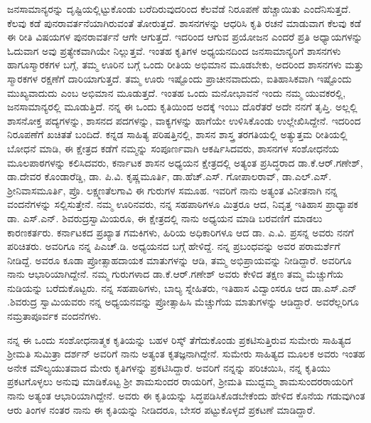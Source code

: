 ಜನಸಾಮಾನ್ಯರನ್ನು ದೃಷ್ಟಿಯಲ್ಲಿಟ್ಟುಕೊಂಡು ಬರೆದಿರುವುದರಿಂದ ಕೆಲವೆಡೆ ನಿರೂಪಣೆ ಹೆಚ್ಚಾಯಿತು ಎಂದೆನಿಸು\-ತ್ತದೆ. ಕೆಲವು ಕಡೆ ಪುನರಾವರ್ತನೆಯಾಗಿರುವಂತೆ ತೋರುತ್ತದೆ. ಶಾಸನಗಳನ್ನು ಆಧರಿಸಿ ಕೃತಿ ರಚನೆ ಮಾಡುವಾಗ ಕೆಲವು ಕಡೆ ಈ ರೀತಿ ವಿಷಯಗಳ ಪುನರಾವರ್ತನೆ ಆಗೇ ಆಗುತ್ತದೆ. ಇದರಿಂದ ಆಗುವ ಪ್ರಯೋಜನ ಎಂದರೆ ಪ್ರತಿ ಅಧ್ಯಾಯಗಳನ್ನು ಓದುವಾಗ ಅವು ಪ್ರತ್ಯೇಕವಾಗಿಯೇ ನಿಲ್ಲುತ್ತವೆ. ಇಂತಹ ಕೃತಿಗಳ ಅಧ್ಯಯನದಿಂದ ಜನಸಾಮಾನ್ಯರಿಗೆ ಶಾಸನಗಳು ಹಾಗೂ\break ಸ್ಮಾರಕಗಳ ಬಗ್ಗೆ, ತಮ್ಮ ಊರಿನ ಬಗ್ಗೆ ಒಂದು ರೀತಿಯ ಅಭಿಮಾನ ಮೂಡಬೇಕು, ಅದರಿಂದ ಶಾಸನಗಳು ಮತ್ತು ಸ್ಮಾರಕಗಳ ರಕ್ಷಣೆಗೆ ದಾರಿಯಾಗುತ್ತದೆ. ತಮ್ಮ ಊರು ಇಷ್ಟೊಂದು ಪ್ರಾಚೀನವಾದುದು, ಐತಿಹಾಸಿಕವಾಗಿ ಇಷ್ಟೊಂದು ಮುಖ್ಯವಾದುದು ಎಂಬ ಅಭಿಮಾನ ಮೂಡುತ್ತದೆ. ಇಂತಹ ಒಂದು ಮನೋಭಾವನೆ ಇಂದು ನಮ್ಮ ಯುವಕರಲ್ಲಿ, ಜನಸಾಮಾನ್ಯರಲ್ಲಿ ಮೂಡು\-ತ್ತಿದೆ. ನನ್ನ ಈ ಒಂದು ಕೃತಿಯಿಂದ ಅದಕ್ಕೆ ಇಂಬು ದೊರೆತರೆ ಅದೇ ನನಗೆ ತೃಪ್ತಿ. ಅಲ್ಲಲ್ಲಿ ಶಾಸನೋಕ್ತ ಪದ್ಯಗಳನ್ನು, ಶಾಸನದ ಪದಗಳನ್ನು, ವಾಕ್ಯಗಳನ್ನು ಹಾಗೆಯೇ ಉಳಿಸಿಕೊಂಡು ಉಲ್ಲೇಖಿಸಿದ್ದೇನೆ. ಇದರಿಂದ ನಿರೂಪಣೆಗೆ ಖಚಿತತೆ ಬಂದಿದೆ. ಕನ್ನಡ ಸಾಹಿತ್ಯ ಪರಿಷತ್ತಿನಲ್ಲಿ, ಶಾಸನ ಶಾಸ್ತ್ರ ತರಗತಿಯಲ್ಲಿ ಅತ್ಯುತ್ತಮ ರೀತಿಯಲ್ಲಿ ಬೋಧನೆ ಮಾಡಿ, ಈ ಕ್ಷೇತ್ರದ ಕಡೆಗೆ ನಮ್ಮನ್ನು ಸಂಪೂರ್ಣವಾಗಿ ಆಕರ್ಷಿಸಿದವರು, ಶಾಸನಗಳ ಸಂಶೋಧನೆಯ ಮೂಲಪಾಠಗಳನ್ನು ಕಲಿಸಿದವರು, ಕರ್ನಾಟಕ ಶಾಸನ ಅಧ್ಯಯನ ಕ್ಷೇತ್ರದಲ್ಲಿ ಅತ್ಯಂತ ಪ್ರಸಿದ್ಧರಾದ ಡಾ.ಕೆ.ಆರ್​.ಗಣೇಶ್​, ಡಾ.ದೇವರ ಕೊಂಡಾರೆಡ್ಡಿ, ಡಾ. ಪಿ.ವಿ. ಕೃಷ್ಣಮೂರ್ತಿ, ಡಾ.ಹೆಚ್​.ಎಸ್​. ಗೋಪಾಲರಾವ್​, ಡಾ.ಎಲ್​.ಎಸ್​. ಶ‍್ರೀನಿವಾಸಮೂರ್ತಿ, ಪ್ರೊ. ಲಕ್ಷ್ಮಣತೆಲಗಾವಿ ಈ ಗುರುಗಳ ಸಮೂಹ. ಇವರಿಗೆ ನಾನು ಅತ್ಯಂತ ವಿನೀತನಾಗಿ ನನ್ನ ವಂದನೆಗಳನ್ನು ಸಲ್ಲಿಸುತ್ತೇನೆ. ನಮ್ಮ ಊರಿನವರು, ನನ್ನ ಸಹಪಾಠಿಗಳೂ ಮಿತ್ರರೂ ಆದ, ನಿವೃತ್ತ ಇತಿಹಾಸ ಪ್ರಾಧ್ಯಾಪಕ ಡಾ. ಎಸ್​.ಎನ್​. ಶಿವರುದ್ರಸ್ವಾಮಿಯರೂ, ಈ ಕ್ಷೇತ್ರದಲ್ಲಿ ನಾನು ಅಧ್ಯಯನ ಮಾಡಿ ಬರವಣಿಗೆ ಮಾಡಲು ಕಾರಣಕರ್ತರು. ಕರ್ನಾಟಕದ ಪ್ರಖ್ಯಾತ ಗಮಕಿಗಳು, ಹಿರಿಯ ಅಧಿಕಾರಿಗಳೂ ಆದ ಡಾ. ಎ.ವಿ. ಪ್ರಸನ್ನ ಅವರು ನನಗೆ ಪರಿಚಿತರು. ಅವರಿಗೂ ನನ್ನ ಪಿಎಚ್​.ಡಿ. ಅಧ್ಯಯನದ ಬಗ್ಗೆ ಹೇಳಿದ್ದೆ. ನನ್ನ ಪ್ರಬಂಧವನ್ನು ಅವರ ಪರಾಮರ್ಶೆಗೆ ನೀಡಿದ್ದೆ. ಅವರೂ ಕೂಡಾ ಪ್ರೋತ್ಸಾಹದಾಯಕ ಮಾತುಗಳನ್ನು ಆಡಿ, ತಮ್ಮ ಅಭಿಪ್ರಾಯವನ್ನು ನೀಡಿದ್ದಾರೆ. ಅವರಿಗೂ ನಾನು ಆಭಾರಿಯಾಗಿದ್ದೇನೆ. ನಮ್ಮ ಗುರುಗಳಾದ ಡಾ.ಕೆ.ಆರ್​.ಗಣೇಶ್​ ಅವರು ಕೇಳಿದ ತಕ್ಷಣ ತಮ್ಮ ಮೆಚ್ಚುಗೆಯ ನುಡಿಯನ್ನು ಬರೆದು\-ಕೊಟ್ಟರು. ನನ್ನ ಸಹಪಾಠಿಗಳು, ಬಾಲ್ಯ ಸ್ನೇಹಿತರು, ಇತಿಹಾಸ ವಿದ್ವಾಂಸರೂ ಆದ ಡಾ.ಎಸ್​.ಎನ್​.ಶಿವರುದ್ರ ಸ್ವಾಮಿಯವರು ನನ್ನ ಅಧ್ಯಯನವನ್ನು ಪ್ರೋತ್ಸಾಹಿಸಿ ಮೆಚ್ಚುಗೆಯ ಮಾತುಗಳನ್ನು ಆಡಿದ್ದಾರೆ. ಅವರೆಲ್ಲರಿಗೂ ನಮ್ರತಾಪೂರ್ವಕ ವಂದನೆಗಳು.

ನನ್ನ ಈ ಒಂದು ಸಂಶೋಧನಾತ್ಮಕ ಕೃತಿಯನ್ನು ಬಹಳ ರಿಸ್ಕ್​ ತೆಗೆದುಕೊಂಡು ಪ್ರಕಟಿಸುತ್ತಿರುವ ಸುಮೇರು ಸಾಹಿತ್ಯದ ಶ‍್ರೀಮತಿ ಸುಮಿತ್ರಾ ದರ್ಶನ್​ ಅವರಿಗೆ ನಾನು ಅತ್ಯಂತ ಕೃತಜ್ಞನಾಗಿದ್ದೇನೆ. ಸುಮೇರು ಸಾಹಿತ್ಯದ ಮೂಲಕ ಅವರು ಇಂತಹ ಅನೇಕ ಮೌಲ್ಯಯುತವಾದ ಮೇರು ಕೃತಿಗಳನ್ನು ಪ್ರಕಟಿಸಿದ್ದಾರೆ. ಅವರಿಗೆ ನನ್ನನ್ನು ಪರಿಚಯಿಸಿ, ನನ್ನ ಕೃತಿಯು ಪ್ರಕಟಗೊಳ್ಳಲು ಅನುವು ಮಾಡಿಕೊಟ್ಟ ಶ‍್ರೀ ಶಾಮಸುಂದರ ರಾಯರಿಗೆ, ಶ‍್ರೀಮತಿ ಮುದ್ದಮ್ಮ ಶಾಮಸುಂದರರಾಯರಿಗೆ ನಾನು ಅತ್ಯಂತ ಆಭಾರಿಯಾಗಿದ್ದೇನೆ. ಅವರು ಈ ಕೃತಿಯನ್ನು ಸಿದ್ಧಪಡಿಸಿಕೊಡಬೇಕೆಂದು ಹೇಳಿದ ಕೊನೆಯ ಗಡುವುಗಿಂತ ಆರು ತಿಂಗಳ ನಂತರ ನಾನು ಈ ಕೃತಿಯನ್ನು ನೀಡಿದರೂ, ಬೇಸರ ಪಟ್ಟುಕೊಳ್ಳದೆ ಪ್ರಕಟಣೆ ಮಾಡಿದ್ದಾರೆ.

